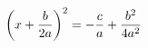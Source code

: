 \documentclass[preview]{standalone}
\begin{document}
\begin{align*}
\left( x + { b \over 2 a } \right) ^2 = - { c \over a } + { b ^2 \over 4 a ^2 }
\end{align*}
\end{document}
